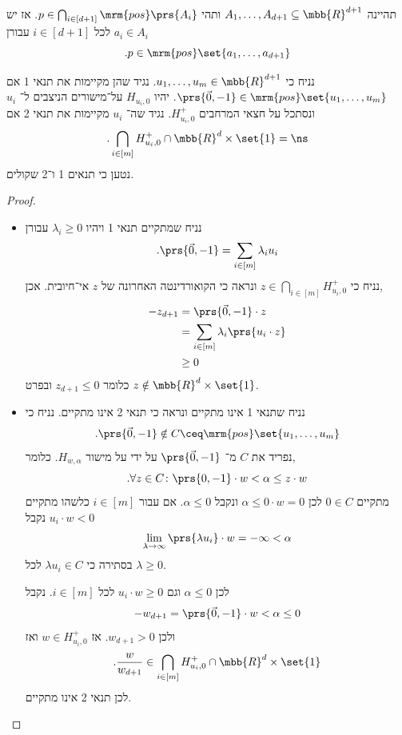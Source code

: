 \documentclass[a4paper,10pt,twoside,openany]{book}
\begin{document}
\begin{theorem}
תהיינה
$A_1, \ldots, A_{d+1} \subseteq \mbb{R}^{d+1}$
ותהי
$p \in \bigcap_{i \in [d+1]} \mrm{pos}\prs{A_i}$.
אז יש
$a_i \in A_{i}$
לכל
$i \in [d+1]$
עבורן
\[\text{.} p \in \mrm{pos}\set{a_1, \ldots, a_{d+1}}\]
\end{theorem}

\begin{lemma}\label{lemma:pos-conditions}
נניח כי
$u_1, \ldots, u_m \in \mbb{R}^{d+1}$.
נגיד שהן מקיימות את תנאי
1
אם
$\prs{\vec{0}, -1} \in \mrm{pos}\set{u_1, \ldots, u_m}$.
יהיו
$H_{u_i, 0}$
על־מישורים הניצבים ל־%
$u_i$
ונסתכל על חצאי המרחבים
$H_{u_i, 0}^+$.
נגיד שה־%
$u_i$
מקיימות את תנאי 2 אם
\[\text{.} \bigcap_{i \in [m]} H_{u_i, 0}^+ \cap \mbb{R}^d \times \set{1} = \ns\]
נטען כי תנאים 1 ו־2 שקולים.
\end{lemma}

\begin{proof}
\begin{itemize}
\item נניח שמתקיים תנאי 1 ויהיו
$\lambda_i \geq 0$
עבורן
\[\text{.} \prs{\vec{0}, -1} = \sum_{i \in [m]} \lambda_i u_i\]
נניח כי
$z \in \bigcap_{i \in [m]} H_{u_i, 0}^+$
ונראה כי הקואורדינטה האחרונה של
$z$
אי־חיובית.
אכן,
\begin{align*}
-z_{d+1} &= \prs{\vec{0}, -1} \cdot z
\\&= \sum_{i \in [m]} \lambda_i \prs{u_i \cdot z}
\\&\geq 0
\end{align*}
כלומר
$z_{d+1} \leq 0$
ובפרט
$z \notin \mbb{R}^d \times \set{1}$.
\item נניח שתנאי 1 אינו מתקיים ונראה כי תנאי 2 אינו מתקיים.
נניח כי
\[\text{.} \prs{\vec{0}, -1} \notin C \ceq \mrm{pos}\set{u_1, \ldots, u_m}\]
נפריד את
$C$
מ־%
$\prs{\vec{0}, -1}$
על ידי על מישור
$H_{w,\alpha}$.
כלומר,
\[\text{.} \forall z \in C \colon \prs{0,-1} \cdot w < \alpha \leq z \cdot w\]
מתקיים
$0 \in C$
לכן
$\alpha \leq 0 \cdot w = 0$
ונקבל
$\alpha \leq 0$.
אם עבור
$i \in [m]$
כלשהו מתקיים
$u_i \cdot w < 0$
נקבל
\[\lim_{\lambda \to \infty} \prs{\lambda u_i} \cdot w = -\infty < \alpha\]
בסתירה כי
$\lambda u_i \in C$
לכל
$\lambda \geq 0$.

לכן
$\alpha \leq 0$
וגם
$u_i \cdot w \geq 0$
לכל
$i \in [m]$.
נקבל
\[-w_{d+1} = \prs{\vec{0}, -1} \cdot w < \alpha \leq 0\]
ולכן
$w_{d+1} > 0$.
אז
$w \in H_{u_i, 0}^+$
ואז
\[\text{.} \frac{w}{w_{d+1}} \in \bigcap_{i \in [m]} H_{u_i, 0}^+ \cap \mbb{R}^d \times \set{1}\]
לכן תנאי 2 אינו מתקיים.
\end{itemize}
\end{proof}
\end{document}
